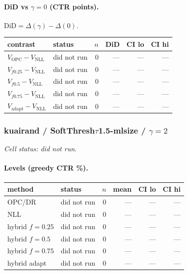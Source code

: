 \documentclass[10pt,a4paper]{article}
\begin{document}
\paragraph{DiD vs $\gamma=0$ (CTR points).} $\mathrm{DiD}=\Delta(\gamma)-\Delta(0)$.
{\centering\small\begin{tabular}{llrrrr}
\toprule contrast & status & $n$ & DiD & CI lo & CI hi \\
\midrule
$V_{\mathrm{OPC}}-V_{\mathrm{NLL}}$ & did not run & 0 & --- & --- & --- \\
$V_{f0.25}-V_{\mathrm{NLL}}$ & did not run & 0 & --- & --- & --- \\
$V_{f0.5}-V_{\mathrm{NLL}}$ & did not run & 0 & --- & --- & --- \\
$V_{f0.75}-V_{\mathrm{NLL}}$ & did not run & 0 & --- & --- & --- \\
$V_{\mathrm{adapt}}-V_{\mathrm{NLL}}$ & did not run & 0 & --- & --- & --- \\
\bottomrule\end{tabular}\par}
\bigskip
\subsubsection{kuairand / SoftThresh$\tau$1.5-mlsize / $\gamma=2$}
\emph{Cell status: did not run}.
\paragraph{Levels (greedy CTR \%).}
{\centering\small\begin{tabular}{llrrrr}
\toprule method & status & $n$ & mean & CI lo & CI hi \\
\midrule
OPC/DR & did not run & 0 & --- & --- & --- \\
NLL & did not run & 0 & --- & --- & --- \\
hybrid $f{=}0.25$ & did not run & 0 & --- & --- & --- \\
hybrid $f{=}0.5$ & did not run & 0 & --- & --- & --- \\
hybrid $f{=}0.75$ & did not run & 0 & --- & --- & --- \\
hybrid adapt & did not run & 0 & --- & --- & --- \\
\bottomrule\end{tabular}\par}
\end{document}
